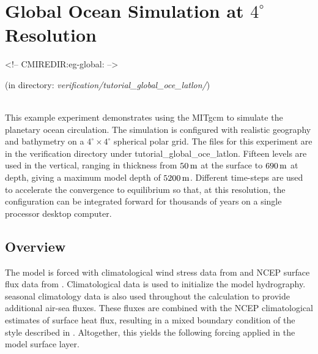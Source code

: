 
\section[Global Ocean MITgcm Example]{Global Ocean Simulation at $4^\circ$ Resolution}
\label{sec:eg-global}
\begin{rawhtml}
<!-- CMIREDIR:eg-global: -->
\end{rawhtml}
\begin{center}
(in directory: {\it verification/tutorial\_global\_oce\_latlon/})
\end{center}


\\

%
%

This example experiment demonstrates using the MITgcm to simulate the
planetary ocean circulation. The simulation is configured with
realistic geography and bathymetry on a $4^{\circ} \times 4^{\circ}$
spherical polar grid. The files for this experiment are in the
verification directory under tutorial\_global\_oce\_latlon. Fifteen
levels are used in the vertical, ranging in thickness from $50\,{\rm
  m}$ at the surface to $690\,{\rm m}$ at depth, giving a maximum
model depth of $5200\,{\rm m}$.
Different time-steps are used to accelerate the convergence to
equilibrium \cite[]{bryan:84} so that, at this resolution,
the configuration can be integrated forward for thousands of years
on a single processor desktop computer.
\\
\subsection{Overview}

The model is forced with climatological wind stress data from
\citet{trenberth90} and NCEP surface flux data from
\citet{kalnay96}. Climatological data \citep{Levitus94} is
used to initialize the model hydrography. \citeauthor{Levitus94} seasonal
climatology data is also used throughout the calculation to provide
additional air-sea fluxes.  These fluxes are combined with the NCEP
climatological estimates of surface heat flux, resulting in a mixed
boundary condition of the style described in \citet{Haney}.
Altogether, this yields the following forcing applied in the model
surface layer.

